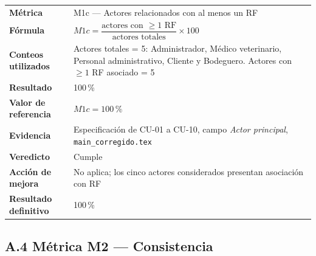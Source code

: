 \begin{tabular}{p{3.2cm}p{9.5cm}}
\hline
\textbf{Métrica} &
M1c — Actores relacionados con al menos un RF \\

\textbf{Fórmula} &
$M1c =
\dfrac{\text{actores con }\geq1\text{ RF}}
{\text{actores totales}}\times100$ \\

\textbf{Conteos utilizados} &
Actores totales = 5:
Administrador, Médico veterinario, Personal administrativo,
Cliente y Bodeguero. \newline
Actores con $\geq1$ RF asociado = 5 \\

\textbf{Resultado} & 100\,\% \\

\textbf{Valor de referencia} & $M1c = 100\,\%$ \\

\textbf{Evidencia} &
Especificación de CU-01 a CU-10, campo \emph{Actor principal},
\texttt{main\_corregido.tex} \\

\textbf{Veredicto} & Cumple \\

\textbf{Acción de mejora} &
No aplica; los cinco actores considerados presentan asociación con RF \\

\textbf{Resultado definitivo} & 100\,\% \\

\hline
\end{tabular}

\subsection*{A.4 Métrica M2 — Consistencia}

